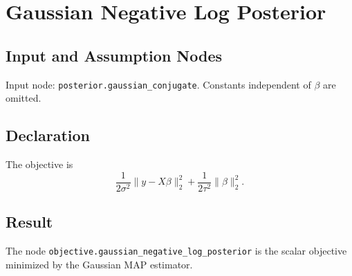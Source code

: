 \section{Gaussian Negative Log Posterior}
\label{objective:gaussian-negative-log-posterior}

\subsection{Input and Assumption Nodes}
Input node: \texttt{posterior.gaussian\_conjugate}. Constants independent of \(\beta\) are omitted.

\subsection{Declaration}
The objective is
\[
  \frac{1}{2\sigma^2}\|y-X\beta\|_2^2
  +
  \frac{1}{2\tau^2}\|\beta\|_2^2.
\]

\subsection{Result}
The node \texttt{objective.gaussian\_negative\_log\_posterior} is the scalar objective minimized by the Gaussian MAP estimator.

